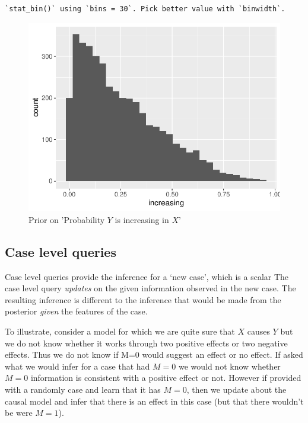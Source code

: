 \documentclass[
  article]{jss}
\begin{document}
\begin{verbatim}
`stat_bin()` using `bins = 30`. Pick better value with `binwidth`.
\end{verbatim}

\begin{figure}[H]

{\centering \includegraphics{paper_files/figure-pdf/unnamed-chunk-34-1.pdf}

}

\caption{Prior on 'Probability \(Y\) is increasing in \(X\)'}

\end{figure}

\hypertarget{case-level-queries}{%
\subsection{Case level queries}\label{case-level-queries}}

Case level queries provide the inference for a `new case', which is a
scalar The case level query \emph{updates} on the given information
observed in the new case. The resulting inference is different to the
inference that would be made from the posterior \emph{given} the
features of the case.

To illustrate, consider a model for which we are quite sure that \(X\)
causes \(Y\) but we do not know whether it works through two positive
effects or two negative effects. Thus we do not know if M=0 would
suggest an effect or no effect. If asked what we would infer for a case
that had \(M=0\) we would not know whether \(M=0\) information is
consistent with a positive effect or not. However if provided with a
randomly case and learn that it has \(M=0\), then we update about the
causal model and infer that there is an effect in this case (but that
there wouldn't be were \(M=1\)).
\end{document}
